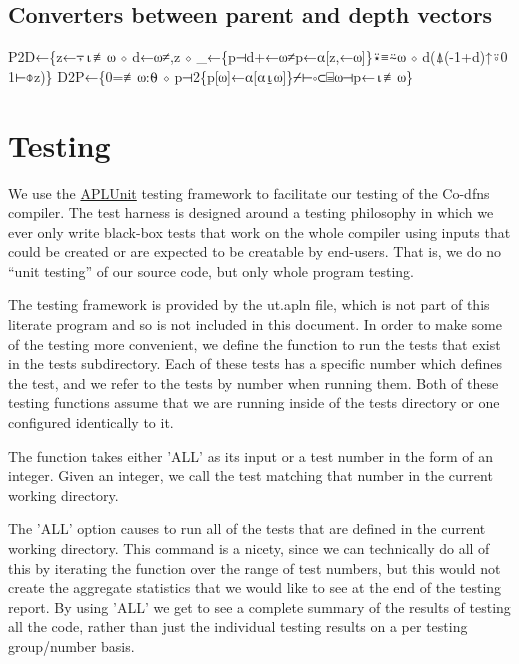 \documentclass{article}%
\begin{document}
\subsection{Converters between parent and depth vectors}

\nwenddocs{}\endmoddef\nwstartdeflinemarkup{}\nwenddeflinemarkup
P2D←\{z←⍪⍳≢⍵ ⋄ d←⍵≠,z ⋄ _←\{p⊣d+←⍵≠p←⍺[z,←⍵]\}⍣≡⍨⍵ ⋄ d(⍋(-1+d)↑⍤0 1⊢⌽z)\}
D2P←\{0=≢⍵:⍬ ⋄ p⊣2\{p[⍵]←⍺[⍺⍸⍵]\}⌿⊢∘⊂⌸⍵⊣p←⍳≢⍵\}
\nwendcode{}\nwdocspar

\section{Testing}

We use the \href{https://github.com/Co-dfns/APLUnit}{APLUnit}
testing framework to facilitate our testing of the Co-dfns compiler.
The test harness is designed around a testing philosophy in which we
ever only write black-box tests that work on the whole compiler
using inputs that could be created or are expected to be creatable
by end-users.
That is, we do no ``unit testing'' of our source code,
but only whole program testing.

The testing framework is provided by the {\Tt{}ut.apln\nwendquote} file,
which is not part of this literate program and so is not included in
this document.
In order to make some of the testing more convenient,
we define the function {\Tt{}\nwendquote} to run the tests
that exist in the {\Tt{}tests{\nwbackslash}\nwendquote} subdirectory.
Each of these tests has a specific number which defines the test,
and we refer to the tests by number when running them.
Both of these testing functions assume that we are running inside
of the {\Tt{}tests{\nwbackslash}\nwendquote} directory or one configured identically to it.

The {\Tt{}\nwendquote} function takes either {\Tt{}'ALL'\nwendquote} as its input or a test
number in the form of an integer.
Given an integer, we call the test matching that number in the
current working directory.

The {\Tt{}'ALL'\nwendquote} option causes {\Tt{}\nwendquote} to run all of the tests that are
defined in the current working directory.
This command is a nicety, since we can technically do all of this
by iterating the {\Tt{}\nwendquote} function over the range of test numbers,
but this would not create the aggregate statistics that we would
like to see at the end of the testing report.
By using {\Tt{}'ALL'\nwendquote} we get to see a complete summary of the
results of testing all the code,
rather than just the individual testing results on a per testing
group/number basis.
\end{document}
